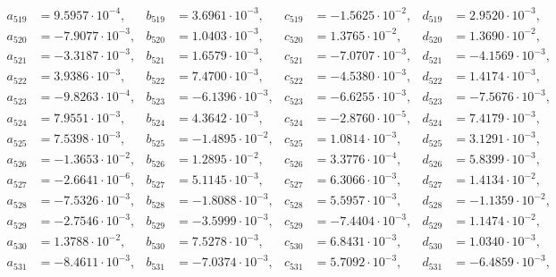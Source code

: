\begin{align*}
  a_{ 519 } &= 9.5957 \cdot 10^{ -4 }, & b_{ 519 } &= 3.6961 \cdot 10^{ -3 }, & c_{ 519 } &= -1.5625 \cdot 10^{ -2 }, & d_{ 519 } &= 2.9520 \cdot 10^{ -3 }, \\ 
  a_{ 520 } &= -7.9077 \cdot 10^{ -3 }, & b_{ 520 } &= 1.0403 \cdot 10^{ -3 }, & c_{ 520 } &= 1.3765 \cdot 10^{ -2 }, & d_{ 520 } &= 1.3690 \cdot 10^{ -2 }, \\ 
  a_{ 521 } &= -3.3187 \cdot 10^{ -3 }, & b_{ 521 } &= 1.6579 \cdot 10^{ -3 }, & c_{ 521 } &= -7.0707 \cdot 10^{ -3 }, & d_{ 521 } &= -4.1569 \cdot 10^{ -3 }, \\ 
  a_{ 522 } &= 3.9386 \cdot 10^{ -3 }, & b_{ 522 } &= 7.4700 \cdot 10^{ -3 }, & c_{ 522 } &= -4.5380 \cdot 10^{ -3 }, & d_{ 522 } &= 1.4174 \cdot 10^{ -3 }, \\ 
  a_{ 523 } &= -9.8263 \cdot 10^{ -4 }, & b_{ 523 } &= -6.1396 \cdot 10^{ -3 }, & c_{ 523 } &= -6.6255 \cdot 10^{ -3 }, & d_{ 523 } &= -7.5676 \cdot 10^{ -3 }, \\ 
  a_{ 524 } &= 7.9551 \cdot 10^{ -3 }, & b_{ 524 } &= 4.3642 \cdot 10^{ -3 }, & c_{ 524 } &= -2.8760 \cdot 10^{ -5 }, & d_{ 524 } &= 7.4179 \cdot 10^{ -3 }, \\ 
  a_{ 525 } &= 7.5398 \cdot 10^{ -3 }, & b_{ 525 } &= -1.4895 \cdot 10^{ -2 }, & c_{ 525 } &= 1.0814 \cdot 10^{ -3 }, & d_{ 525 } &= 3.1291 \cdot 10^{ -3 }, \\ 
  a_{ 526 } &= -1.3653 \cdot 10^{ -2 }, & b_{ 526 } &= 1.2895 \cdot 10^{ -2 }, & c_{ 526 } &= 3.3776 \cdot 10^{ -4 }, & d_{ 526 } &= 5.8399 \cdot 10^{ -3 }, \\ 
  a_{ 527 } &= -2.6641 \cdot 10^{ -6 }, & b_{ 527 } &= 5.1145 \cdot 10^{ -3 }, & c_{ 527 } &= 6.3066 \cdot 10^{ -3 }, & d_{ 527 } &= 1.4134 \cdot 10^{ -2 }, \\ 
  a_{ 528 } &= -7.5326 \cdot 10^{ -3 }, & b_{ 528 } &= -1.8088 \cdot 10^{ -3 }, & c_{ 528 } &= 5.5957 \cdot 10^{ -3 }, & d_{ 528 } &= -1.1359 \cdot 10^{ -2 }, \\ 
  a_{ 529 } &= -2.7546 \cdot 10^{ -3 }, & b_{ 529 } &= -3.5999 \cdot 10^{ -3 }, & c_{ 529 } &= -7.4404 \cdot 10^{ -3 }, & d_{ 529 } &= 1.1474 \cdot 10^{ -2 }, \\ 
  a_{ 530 } &= 1.3788 \cdot 10^{ -2 }, & b_{ 530 } &= 7.5278 \cdot 10^{ -3 }, & c_{ 530 } &= 6.8431 \cdot 10^{ -3 }, & d_{ 530 } &= 1.0340 \cdot 10^{ -3 }, \\ 
  a_{ 531 } &= -8.4611 \cdot 10^{ -3 }, & b_{ 531 } &= -7.0374 \cdot 10^{ -3 }, & c_{ 531 } &= 5.7092 \cdot 10^{ -3 }, & d_{ 531 } &= -6.4859 \cdot 10^{ -3 }, \\ 

\end{align*}
